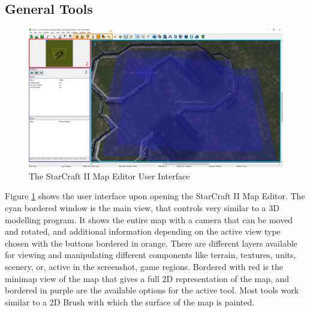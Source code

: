 \subsection{General Tools}
\begin{figure}[htb]

  \centering
      \includegraphics[width=1\textwidth]{Figures/Editor_bordered.png}
  \caption{The StarCraft II Map Editor User Interface}
  \label{fig:editor-general}
\end{figure}
Figure \ref{fig:editor-general} shows the user interface upon opening the StarCraft II Map Editor.
The cyan bordered window is the main view, that controls very similar to a 3D modelling program. It shows the entire map with a camera that can be moved and rotated, and additional information depending on the active view type chosen with the buttons bordered in orange. There are different layers available for viewing and manipulating different components like terrain, textures, units, scenery, or, active in the screenshot, game regions. Bordered with red is the minimap view of the map that gives a full 2D representation of the map, and bordered in purple are the available options for the active tool. Most tools work similar to a 2D Brush with which the surface of the map is painted.


